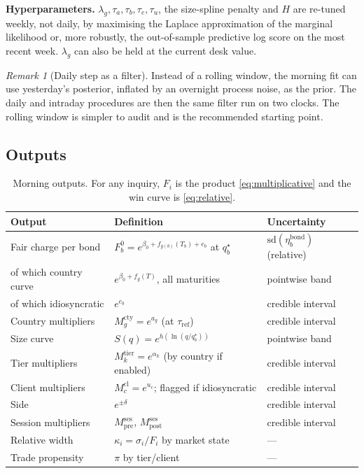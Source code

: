 \documentclass[11pt,a4paper]{article}
\theoremstyle{definition}
\theoremstyle{remark}
\newtheorem{remark}{Remark}
\begin{document}
\textbf{Hyperparameters.} $\lambda_g,\tau_a,\tau_b,\tau_e,\tau_u$, the size-spline penalty and $H$ are re-tuned weekly, not daily, by maximising the Laplace approximation of the marginal likelihood or, more robustly, the out-of-sample predictive log score on the most recent week. $\lambda_g$ can also be held at the current desk value.

\begin{remark}[Daily step as a filter]
Instead of a rolling window, the morning fit can use yesterday's posterior, inflated by an overnight process noise, as the prior. The daily and intraday procedures are then the same filter run on two clocks. The rolling window is simpler to audit and is the recommended starting point.
\end{remark}

\subsection{Outputs}
\begin{table}[h]
\centering
\small
\begin{tabular}{lll}
\toprule
Output & Definition & Uncertainty \\
\midrule
Fair charge per bond & $F^0_b=e^{\beta_0+f_{g(b)}(T_b)+e_b}$ at $q^\star_b$ & $\mathrm{sd}(\eta^{\mathrm{bond}}_b)$ (relative) \\
\quad of which country curve & $e^{\beta_0+f_{g}(T)}$, all maturities & pointwise band \\
\quad of which idiosyncratic & $e^{e_b}$ & credible interval \\
Country multipliers & $M^{\mathrm{cty}}_g=e^{a_g}$ (at $\tau_{\mathrm{ref}}$) & credible interval \\
Size curve & $S(q)=e^{h(\ln(q/q^\star_b))}$ & pointwise band \\
Tier multipliers & $M^{\mathrm{tier}}_k=e^{\alpha_k}$ (by country if enabled) & credible interval \\
Client multipliers & $M^{\mathrm{cl}}_c=e^{u_c}$; flagged if idiosyncratic & credible interval \\
Side & $e^{\pm\delta}$ & credible interval \\
Session multipliers & $M^{\mathrm{ses}}_{\mathrm{pre}}$, $M^{\mathrm{ses}}_{\mathrm{post}}$ & credible interval \\
Relative width & $\kappa_i=\sigma_i/F_i$ by market state & --- \\
Trade propensity & $\pi$ by tier/client & --- \\
\bottomrule
\end{tabular}
\caption{Morning outputs. For any inquiry, $F_i$ is the product \eqref{eq:multiplicative} and the win curve is \eqref{eq:relative}.}
\label{tab:outputs}
\end{table}
\end{document}
